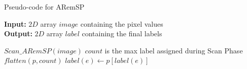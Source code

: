\begin{algorithm}[H]
\small
{
	\caption{Pseudo-code for ARemSP}
	\label{alg:ARemSP}
	\textbf{Input:} $2D$ array $image$ containing the pixel values \\
	\textbf{Output:} $2D$ array $label$ containing the final labels
	\begin{algorithmic}[1]
		\State $Scan\_ARemSP(image)$ 
		\LineComment $count$ is the max label assigned during Scan Phase
		\State $flatten(p,count)$ 
		  
			 
				\State $label(e) \gets p[label(e)]$
			\EndFor
		\EndFor		
	\EndFunction
	\end{algorithmic}	
}
\end{algorithm}

